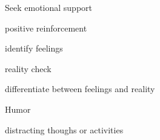 \documentclass[aspectratio=169]{beamer}
\begin{document}
\begin{frame}
  \begin{center}
    \Huge Seek emotional support
    \\ \small \cite{hh15}
  \end{center}
\end{frame}

\begin{frame}
  \begin{center}
    \Huge positive reinforcement
    \\ \small \cite{hh15}
  \end{center}
\end{frame}

\begin{frame}
  \begin{center}
    \Huge identify feelings
    \\ \small \cite{caltech}
  \end{center}
\end{frame}

\begin{frame}
  \begin{center}
    \Huge reality check
    \\ \small \cite{caltech}
  \end{center}
\end{frame}

\begin{frame}
  \begin{center}
    \Huge differentiate between feelings and reality
    \\ \small \cite{caltech}
  \end{center}
\end{frame}

\begin{frame}
  \begin{center}
    \Huge Humor
    \\ \small \cite{hh15}
  \end{center}
\end{frame}

\begin{frame}
  \begin{center}
    \Huge distracting thoughs or activities
    \\ \small \cite{hh15}
  \end{center}
\end{frame}
\end{document}
